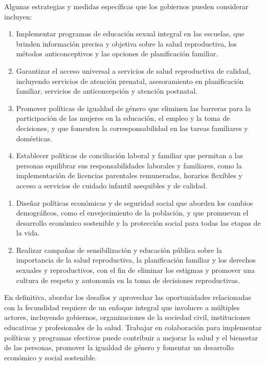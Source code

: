 \documentclass[8pt,a4paper]{beamer}
\begin{document}
{\begin{frame}{}
\begin{block}{}
\setlength{\parskip}{3px}
\justifying
Algunas estrategias y medidas específicas que los gobiernos pueden considerar incluyen:
\begin{enumerate}
\setlength{\parskip}{3px}
\justifying
\item[\ding{65}] Implementar programas de educación sexual integral en las escuelas, que brinden información precisa y objetiva sobre la salud reproductiva, los métodos anticonceptivos y las opciones de planificación familiar.
\item[\ding{65}] Garantizar el acceso universal a servicios de salud reproductiva de calidad, incluyendo servicios de atención prenatal, asesoramiento en planificación familiar, servicios de anticoncepción y atención postnatal.
\item[\ding{65}] Promover políticas de igualdad de género que eliminen las barreras para la participación de las mujeres en la educación, el empleo y la toma de decisiones, y que fomenten la corresponsabilidad en las tareas familiares y domésticas.
\item[\ding{65}] Establecer políticas de conciliación laboral y familiar que permitan a las personas equilibrar sus responsabilidades laborales y familiares, como la implementación de licencias parentales remuneradas, horarios flexibles y acceso a servicios de cuidado infantil asequibles y de calidad.
\end{enumerate}
\end{block}
\end{frame}

\begin{frame}{}
\begin{block}{}
\setlength{\parskip}{3px}
\justifying
\begin{enumerate}
\setlength{\parskip}{3px}
\justifying
\item[\ding{65}] Diseñar políticas económicas y de seguridad social que aborden los cambios demográficos, como el envejecimiento de la población, y que promuevan el desarrollo económico sostenible y la protección social para todas las etapas de la vida.
\item[\ding{65}] Realizar campañas de sensibilización y educación pública sobre la importancia de la salud reproductiva, la planificación familiar y los derechos sexuales y reproductivos, con el fin de eliminar los estigmas y promover una cultura de respeto y autonomía en la toma de decisiones reproductivas.
\end{enumerate}
En definitiva, abordar los desafíos y aprovechar las oportunidades relacionadas con la fecundidad requiere de un enfoque integral que involucre a múltiples actores, incluyendo gobiernos, organizaciones de la sociedad civil, instituciones educativas y profesionales de la salud. Trabajar en colaboración para implementar políticas y programas efectivos puede contribuir a mejorar la salud y el bienestar de las personas, promover la igualdad de género y fomentar un desarrollo económico y social sostenible.
\end{block}
\end{frame}


}
\end{document}
